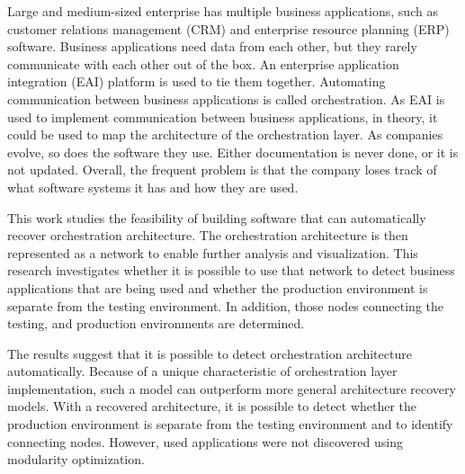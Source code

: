 \documentclass[english, 12pt, a4paper, sci, utf8, a-2b, online, obeyspaces]{aaltothesis}
\date{21.5.2019}
\begin{document}
\makecoverpage
\makecopyrightpage

\begin{abstractpage}[english]
Large and medium-sized enterprise has multiple business applications, such as customer relations management (CRM) and enterprise resource planning (ERP) software. Business applications need data from each other, but they rarely communicate with each other out of the box. An enterprise application integration (EAI) platform is used to tie them together. Automating communication between business applications is called orchestration. As EAI is used to implement communication between business applications, in theory, it could be used to map the architecture of the orchestration layer. As companies evolve, so does the software they use. Either documentation is never done, or it is not updated. Overall, the frequent problem is that the company loses track of what software systems it has and how they are used. 

This work studies the feasibility of building software that can automatically recover orchestration architecture. The orchestration architecture is then represented as a network to enable further analysis and visualization. This research investigates whether it is possible to use that network to detect business applications that are being used and whether the production environment is separate from the testing environment. In addition, those nodes connecting the testing, and production environments are determined.

The results suggest that it is possible to detect orchestration architecture automatically. Because of a unique characteristic of orchestration layer implementation, such a model can outperform more general architecture recovery models. With a recovered architecture, it is possible to detect whether the production environment is separate from the testing environment and to identify connecting nodes. However, used applications were not discovered using modularity optimization.


\end{abstractpage}
\end{document}
